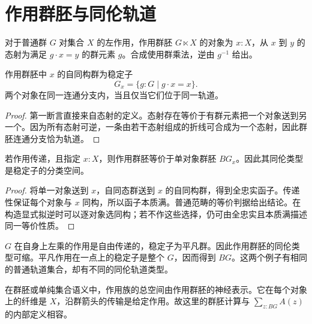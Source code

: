 \section{作用群胚与同伦轨道}
\begin{definition}[作用群胚]
对于普通群 $G$ 对集合 $X$ 的左作用，作用群胚 $G\ltimes X$ 的对象为 $x:X$，从 $x$ 到 $y$ 的态射为满足 $g\cdot x=y$ 的群元素 $g$。合成使用群乘法，逆由 $g^{-1}$ 给出。
\end{definition}
\begin{proposition}
作用群胚中 $x$ 的自同构群为稳定子
\[
G_x=\{g:G\mid g\cdot x=x\}.
\]
两个对象在同一连通分支内，当且仅当它们位于同一轨道。
\end{proposition}
\begin{proof}
第一断言直接来自态射的定义。态射存在等价于有群元素把一个对象送到另一个。因为所有态射可逆，一条由若干态射组成的折线可合成为一个态射，因此群胚连通分支恰为轨道。
\end{proof}
\begin{proposition}[传递作用]
若作用传递，且指定 $x:X$，则作用群胚等价于单对象群胚 $BG_x$。因此其同伦类型是稳定子的分类空间。
\end{proposition}
\begin{proof}
将单一对象送到 $x$，自同态群送到 $x$ 的自同构群，得到全忠实函子。传递性保证每个对象与 $x$ 同构，所以函子本质满。普通范畴的等价判据给出结论。在构造显式拟逆时可以逐对象选同构；若不作这些选择，仍可由全忠实且本质满描述同一等价性质。
\end{proof}
\begin{example}
$G$ 在自身上左乘的作用是自由传递的，稳定子为平凡群。因此作用群胚的同伦类型可缩。平凡作用在一点上的稳定子是整个 $G$，因而得到 $BG$。这两个例子有相同的普通轨道集合，却有不同的同伦轨道类型。
\end{example}
\begin{remark}
在群胚或单纯集合语义中，作用族的总空间由作用群胚的神经表示。它在每个对象上的纤维是 $X$，沿群箭头的传输是给定作用。故这里的群胚计算与 $\sum_{z:BG}A(z)$ 的内部定义相容。
\end{remark}

